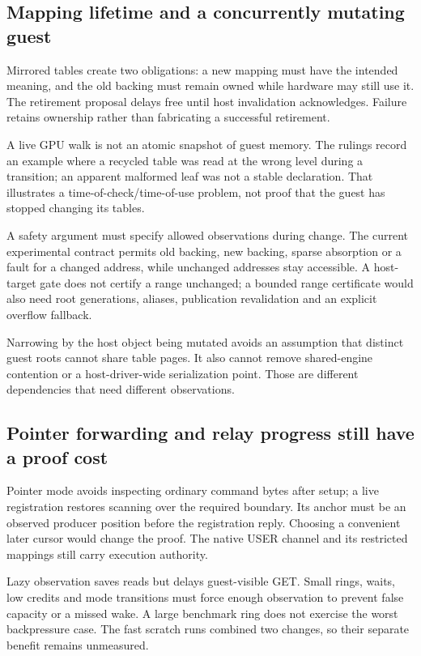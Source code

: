 \subsection{Mapping lifetime and a concurrently mutating guest}

\doc Mirrored tables create two obligations: a new mapping must have the intended meaning,
and the old backing must remain owned while hardware may still use it. The retirement
proposal delays free until host invalidation acknowledges. Failure retains ownership rather
than fabricating a successful retirement.

\doc A live GPU walk is not an atomic snapshot of guest memory. The rulings record an example
where a recycled table was read at the wrong level during a transition; an apparent malformed
leaf was not a stable declaration. That illustrates a time-of-check/time-of-use problem,
not proof that the guest has stopped changing its tables.

\inferred A safety argument must specify allowed observations during change. The current
experimental contract permits old backing, new backing, sparse absorption or a fault for a
changed address, while unchanged addresses stay accessible. A host-target gate does not
certify a range unchanged; a bounded range certificate would also need root generations,
aliases, publication revalidation and an explicit overflow fallback.

\doc Narrowing by the host object being mutated avoids an assumption that distinct guest
roots cannot share table pages. It also cannot remove shared-engine contention or a
host-driver-wide serialization point. Those are different dependencies that need different
observations.

\subsection{Pointer forwarding and relay progress still have a proof cost}

\doc Pointer mode avoids inspecting ordinary command bytes after setup; a live registration
restores scanning over the required boundary. Its anchor must be an observed producer position
before the registration reply. Choosing a convenient later cursor would change the proof.
The native USER channel and its restricted mappings still carry execution authority.

\doc Lazy observation saves reads but delays guest-visible GET. Small rings, waits, low
credits and mode transitions must force enough observation to prevent false capacity or a
missed wake. A large benchmark ring does not exercise the worst backpressure case.
The fast scratch runs combined two changes, so their separate benefit remains unmeasured.

